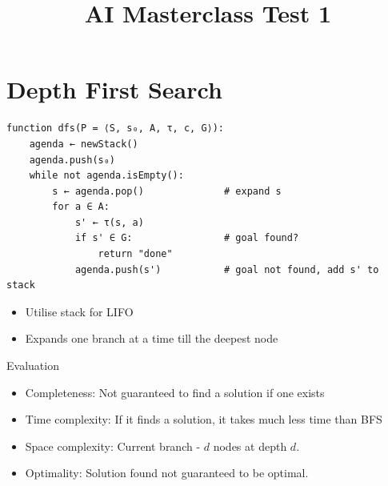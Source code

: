 \documentclass[12pt, a4paper]{article}
\title{AI Masterclass Test 1}
\author{}
\date{}
\begin{document}
\section{Depth First Search}
\begin{algorithm}[H]
\end{algorithm}
\begin{Verbatim}
function dfs(P = ⟨S, s₀, A, τ, c, G⟩):
    agenda ← newStack()
    agenda.push(s₀)
    while not agenda.isEmpty():
        s ← agenda.pop()              # expand s
        for a ∈ A:
            s' ← τ(s, a)
            if s' ∈ G:                # goal found?
                return "done"
            agenda.push(s')           # goal not found, add s' to stack
\end{Verbatim}

\begin{itemize}
    \item Utilise stack for LIFO
    \item Expands one branch at a time till the deepest node
\end{itemize}

\noindent Evaluation
\begin{itemize}
    \item Completeness: Not guaranteed to find a solution if one exists
    \item Time complexity: If it finds a solution, it takes much less time than BFS
    \item Space complexity: Current branch - $d$ nodes at depth $d$.
    \item Optimality: Solution found not guaranteed to be optimal.
\end{itemize}
\end{document}
